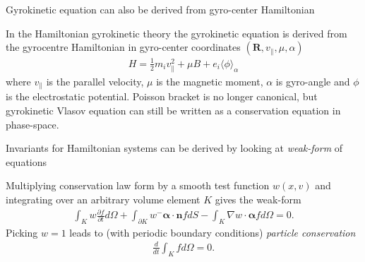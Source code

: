 \documentclass[pdf]{beamer}
\newcommand{\pfrac}[2]{\frac{\partial #1}{\partial #2}}
\newcommand{\mvec}[1]{\mathbf{#1}}
\newcommand{\gvec}[1]{\boldsymbol{#1}}
\theoremstyle{definition}
\begin{document}
\begin{frame}{Gyrokinetic equation can also be derived from
    gyro-center Hamiltonian}

  In the Hamiltonian gyrokinetic theory
  the gyrokinetic equation is derived from the gyrocentre Hamiltonian
  in gyro-center coordinates $(\mvec{R}, v_{\parallel}, \mu, \alpha)$
  \begin{align*}
    H = \frac{1}{2}m_i v_{\parallel}^2 + \mu B + e_i \langle\phi \rangle_\alpha
  \end{align*}
  where $v_{\parallel}$ is the parallel velocity, $\mu$ is the
  magnetic moment, $\alpha$ is gyro-angle and $\phi$ is the
  electrostatic potential. Poisson bracket is no longer canonical, but
  gyrokinetic Vlasov equation can still be written as a conservation
  equation in phase-space.
\end{frame}

\begin{frame}{Invariants for Hamiltonian systems can be derived by
    looking at \emph{weak-form} of equations}%

  Multiplying conservation law form by a smooth test function $w(x,v)$
  and integrating over an arbitrary volume element $K$ gives the
  weak-form
  \begin{align*}
    \int_K w\pfrac{f}{t}d\Omega 
    + \int_{\partial K}w^- \gvec{\alpha}\cdot\mvec{n}f dS
    - \int_K \nabla w \cdot \gvec{\alpha} f d\Omega
    = 0.
  \end{align*}
  Picking $w=1$ leads to (with periodic boundary conditions)
  \emph{particle conservation}
  \begin{align*}
    \frac{d}{dt} \int_K f d\Omega = 0.
  \end{align*}

\end{frame}
\end{document}

